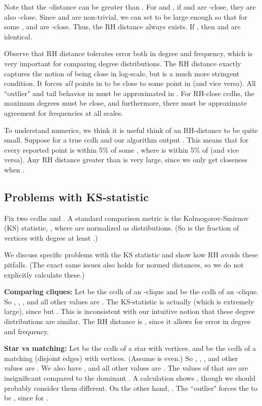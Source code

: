 \documentclass[11pt]{article}
\theoremstyle{definition}
\begin{document}
Note that the -distance can be greater than .
For  and , if  and  are -close,
they are also -close. Since  and  are non-trivial, we can set  to be large enough so
that for some ,  and  are -close. Thus, the RH distance always exists.
If , then  and  are identical.

Observe that RH distance tolerates error both in degree and frequency, which is very important for
comparing degree distributions.
The RH distance exactly captures the notion of being close in log-scale, but is a much more stringent condition.
It forces \emph{all} points in  to be close to some point in  (and vice versa).
All ``outlier" and tail behavior in  must be approximated in . For RH-close ccdhs, the maximum degrees
must be close, and furthermore, there must be approximate agreement for frequencies at all scales.

To understand numerics, we think it is useful think of an RH-distance  to be quite small.
Suppose  for a true ccdh  and our algorithm output . This means that
for every reported point  is within 5\% of some , where  is within 5\% of 
(and vice versa). Any RH distance greater than  is very large, since we only get closeness
when .

\subsection{Problems with KS-statistic}

Fix two ccdhs  and . A standard comparison metric is the Kolmogorov-Smirnov (KS) statistic, ,
where  are normalized as distributions. (So  is the fraction of vertices
with degree at least .)

We discuss specific problems with the KS statistic and show how RH avoids these pitfalls.
(The exact same issues also holds for normed distances, so we do not explicitly calculate these.)

\textbf{Comparing cliques:} Let  be the ccdh of an -clique and  be the ccdh of an -clique.
So , , , and all other values are .
The KS-statistic is actually  (which is extremely large), since  but .
This is inconsistent with our intuitive notion that these degree distributions are similar.
The RH distance is , since it allows for error in degree and frequency.

\textbf{Star vs matching:} Let  be the ccdh of a star with  vertices, and 
be the ccdh of a matching (disjoint edges) with  vertices. (Assume  is even.)
So , , , and other values are .
We also have , and all other values are . The values of  that are 
are insignificant compared to the dominant . A calculation shows ,
though we should probably consider them different.
On the other hand, . The ``outlier"  forces the  to be ,
since  for .
\end{document}

